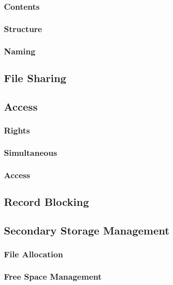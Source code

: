 \subsubsection{Contents}

\subsubsection{Structure}

\subsubsection{Naming}

\subsection{File Sharing}

\subsection{Access}

\subsubsection{Rights}

\subsubsection{Simultaneous}

\subsubsection{Access}

\subsection{Record Blocking}

\subsection{Secondary Storage Management}

\subsubsection{File Allocation}

\subsubsection{Free Space Management }


